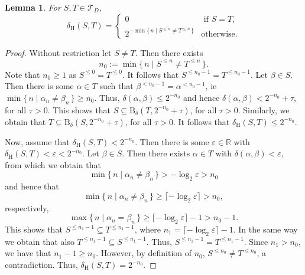 \documentclass[microtype]{jloganal}
\theoremstyle{plain}
\newtheorem{lemma}[theorem]{Lemma}
\theoremstyle{definition}
\newcommand{\TTT}{\mathcal{T}}
\newcommand{\ball}[3]{\mathrm{B}_{#1}(#2,#3)}
\newcommand{\treehdm}{\delta_{\mathrm H}}
\newcommand{\set}[2]{\mbox{$\{\,#1 \mid #2 \,\}$}}
\begin{document}
\begin{lemma}\label{lem-treehausd}
For $S, T \in \TTT_D$,
\[
\treehdm(S,T) =
\begin{cases}
0 & \text{ if $S = T$,}\\
2^{- \min \set{n}{S^{\le n}\not= T^{\le n}}}  & \text{otherwise.}
\end{cases}
\]
\end{lemma}
\begin{proof}
Without restriction let $S \not= T$.  Then there exists 
\[
n_0 := \min \set{n}{S^{\le n} \not= T^{\le n}}.
\]
Note that $n_0 \ge 1$ as $S^{\le 0} = T^{\le 0}$. It follows that $S^{\le n_0-1} = T^{\le n_0-1}$. Let $\beta \in S$. Then there is some $\alpha \in T$ such that $\beta^{<n_0-1} = \alpha^{<n_0-1}$, ie $\min\set{n}{\alpha_n \not= \beta_n} \ge n_0$. Thus, $\delta(\alpha, \beta) \le 2^{-n_0}$ and hence $\delta(\alpha, \beta) < 2^{-n_0} + \tau$, for all $\tau > 0$. This shows that $S \subseteq \ball{\delta}{T}{2^{-n_0}+\tau}$, for all $\tau > 0$. Similarly, we obtain that $T \subseteq \ball{\delta}{S}{2^{-n_0}+\tau}$, for all $\tau > 0$. It follows that $\treehdm(S,T) \le 2^{-n_0}$.

Now, assume that $\treehdm(S,T) < 2^{-n_0}$. Then there is some $\varepsilon \in \mathbb{R}$ with $\treehdm(S,T) < \varepsilon < 2^{-n_0}$. Let $\beta \in S$. Then there exists $\alpha \in T$ with $\delta(\alpha, \beta) < \varepsilon$, from which we obtain that
\[
\min\set{n}{\alpha_n \not= \beta_n} > - \log_2 \varepsilon > n_0
\]
and hence that
\[
\min\set{n}{\alpha_n \not= \beta_n} \ge \lceil - \log_2 \varepsilon \rceil > n_0, 
\]
respectively, 
\[
\max\set{n}{\alpha_n = \beta_n} \ge \lceil - \log_2 \varepsilon \rceil -1 > n_0 -1.
\]
This shows that $S^{\le n_1 -1} \subseteq T^{\le n_1 -1}$, where $n_1 = \lceil - \log_2 \varepsilon \rceil -1$. In the same way we obtain that also $T^{\le n_1 -1} \subseteq S^{\le n_1 -1}$. Thus, $S^{\le n_1 -1} = T^{\le n_1 -1}$. Since $n_1 > n_0$, we have that $n_1 - 1 \ge n_0$. However, by definition of $n_0$, $S^{\le n_0} \not= T^{\le n_0}$,  a contradiction. Thus, $\treehdm(S,T) = 2^{-n_0}$.
\end{proof}
\end{document}
